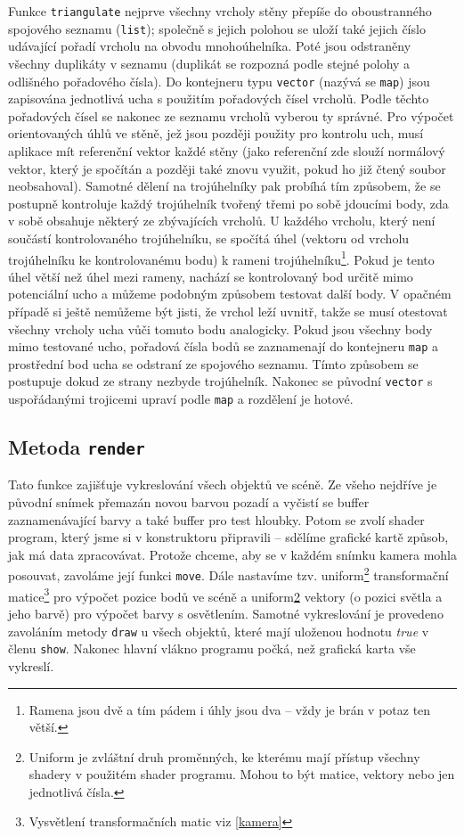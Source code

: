 \documentclass[a4paper, 11pt]{report}
\begin{document}
Funkce \texttt{triangulate} nejprve všechny vrcholy stěny přepíše do oboustranného spojového seznamu (\texttt{list}); společně s jejich polohou se uloží také jejich číslo udávající pořadí vrcholu na obvodu mnohoúhelníka. Poté jsou odstraněny všechny duplikáty v seznamu (duplikát se rozpozná podle stejné polohy a odlišného pořadového čísla). Do kontejneru typu \texttt{vector} (nazývá se \texttt{map}) jsou zapisována jednotlivá ucha s použitím pořadových čísel vrcholů. Podle těchto pořadových čísel se nakonec ze seznamu vrcholů vyberou ty správné. Pro výpočet orientovaných úhlů ve stěně, jež jsou později použity pro kontrolu uch, musí aplikace mít referenční vektor každé stěny (jako referenční zde slouží normálový vektor, který je spočítán a později také znovu využit, pokud ho již čtený soubor neobsahoval). Samotné dělení na trojúhelníky pak probíhá tím způsobem, že se postupně kontroluje každý trojúhelník tvořený třemi po sobě jdoucími body, zda v sobě obsahuje některý ze zbývajících vrcholů. U každého vrcholu, který není součástí kontrolovaného trojúhelníku, se spočítá úhel (vektoru od vrcholu trojúhelníku ke kontrolovanému bodu) k rameni trojúhelníku\footnote{Ramena jsou dvě a tím pádem i úhly jsou dva -- vždy je brán v potaz ten větší.}. Pokud je tento úhel větší než úhel mezi rameny, nachází se kontrolovaný bod určitě mimo potenciální ucho a můžeme podobným způsobem testovat další body. V opačném případě si ještě nemůžeme být jisti, že vrchol leží uvnitř, takže se musí otestovat všechny vrcholy ucha vůči tomuto bodu analogicky. Pokud jsou všechny body mimo testované ucho, pořadová čísla bodů se zaznamenají do kontejneru \texttt{map} a prostřední bod ucha se odstraní ze spojového seznamu. Tímto způsobem se postupuje dokud ze strany nezbyde trojúhelník. Nakonec se původní \texttt{vector} s uspořádanými trojicemi upraví podle \texttt{map} a rozdělení je hotové.

\subsection{Metoda \texttt{render}}
Tato funkce zajišťuje vykreslování všech objektů ve scéně. Ze všeho nejdříve je původní snímek přemazán novou barvou pozadí a vyčistí se buffer zaznamenávající barvy a také buffer pro test hloubky. Potom se zvolí shader program, který jsme si v konstruktoru připravili -- sdělíme grafické kartě způsob, jak má data zpracovávat. Protože chceme, aby se v každém snímku kamera mohla posouvat, zavoláme její funkci \texttt{move}. Dále nastavíme tzv. uniform\footnote{\label{uniform}Uniform je zvláštní druh proměnných, ke kterému mají přístup všechny shadery v použitém shader programu. Mohou to být matice, vektory nebo jen jednotlivá čísla.} transformační matice\footnote{Vysvětlení transformačních matic viz \ref{kamera}} pro výpočet pozice bodů ve scéně a uniform\cref{uniform} vektory (o pozici světla a jeho barvě) pro výpočet barvy s osvětlením. Samotné vykreslování je provedeno zavoláním metody \texttt{draw} u všech objektů, které mají uloženou hodnotu \emph{true} v členu \texttt{show}. Nakonec hlavní vlákno programu počká, než grafická karta vše vykreslí.
\end{document}
